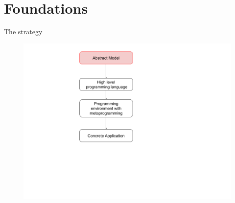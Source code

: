 \documentclass{beamer}
\begin{document}
\section{Foundations}
\begin{frame}{The strategy}
    \begin{figure}
        \includegraphics[height=\textheight]{img/sec1.png}
    \end{figure}
\end{frame}
\end{document}
